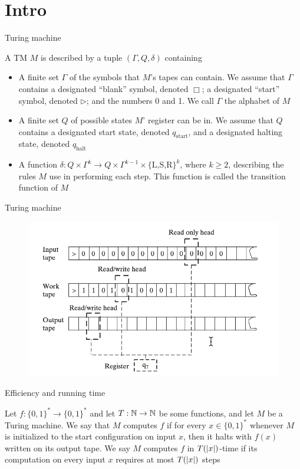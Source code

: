 \documentclass[presentation]{beamer}
\def \start {\text{start}}
\def \halt {\text{halt}}
\begin{document}
\section{Intro}
\label{sec:orge010cbc}
\begin{frame}[label={sec:org2c13950}]{Turing machine}
\begin{definition}[]
A TM \(M\) is described by a tuple \((\Gamma,Q,\delta)\) containing
\begin{itemize}
\item A finite set \(\Gamma\) of the symbols that \(M\)'s tapes can contain. We assume that \(\Gamma\) contains a
designated ``blank'' symbol, denoted \(\Box\); a designated ``start'' symbol, denoted \(\rhd\);
and the numbers 0 and 1. We call \(\Gamma\) the \alert{alphabet} of \(M\)
\item A finite set \(Q\) of possible states \(M\)' register can be in. We assume that \(Q\) contains
a designated start state, denoted \(q_{\start}\), and a designated halting state, denoted \(q_{\halt}\)
\item A function \(\delta:Q\times\Gamma^k\to Q\times\Gamma^{k-1}\times\{\text{L,S,R}\}^k\),
where \(k\ge2\), describing the rules \(M\) use in performing each step. This function is
called the \alert{transition function} of \(M\)
\end{itemize}
\end{definition}
\end{frame}
\begin{frame}[label={sec:org3f2060f}]{Turing machine}
\begin{figure}[htbp]
\centering
\includegraphics[width=.7\textwidth]{./6.png}
\label{}
\end{figure}
\end{frame}
\begin{frame}[label={sec:orgf190eac}]{Efficiency and running time}
\begin{definition}
Let \(f:\{0,1\}^*\to\{0,1\}^*\) and let \(T:\mathbb{N}\to\mathbb{N}\) be some functions, and let \(M\) be a Turing
machine. We say that \(M\) \alert{computes} \(f\) if for every \(x\in\{0,1\}^*\) whenever \(M\) is
initialized to the start configuration on input \(x\), then it halts with \(f(x)\) written on
its output tape. We say \(M\) \alert{computes} \(f\) in \alert{\(T(\abs{x})\)-time} if its computation on every
input \(x\) requires at most \(T(\abs{x})\) steps
\end{definition}
\end{frame}
\end{document}
